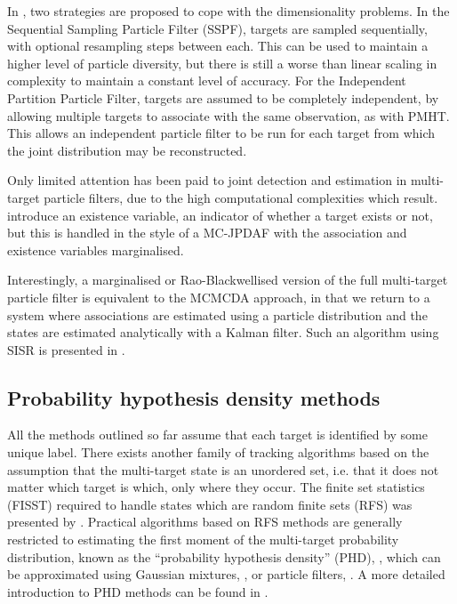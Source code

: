 In \cite{Vermaak2005}, two strategies are proposed to cope with the dimensionality problems. In the Sequential Sampling Particle Filter (SSPF), targets are sampled sequentially, with optional resampling steps between each. This can be used to maintain a higher level of particle diversity, but there is still a worse than linear scaling in complexity to maintain a constant level of accuracy. For the Independent Partition Particle Filter, targets are assumed to be completely independent, by allowing multiple targets to associate with the same observation, as with PMHT. This allows an independent particle filter to be run for each target from which the joint distribution may be reconstructed.

Only limited attention has been paid to joint detection and estimation in multi-target particle filters, due to the high computational complexities which result. \cite{Vermaak2005,Horridge2009} introduce an existence variable, an indicator of whether a target exists or not, but this is handled in the style of a MC-JPDAF with the association and existence variables marginalised.

Interestingly, a marginalised or Rao-Blackwellised version of the full multi-target particle filter is equivalent to the MCMCDA approach, in that we return to a system where associations are estimated using a particle distribution and the states are estimated analytically with a Kalman filter. Such an algorithm using SISR is presented in \cite{Sarkka2007}.




\subsection{Probability hypothesis density methods}
All the methods outlined so far assume that each target is identified by some unique label. There exists another family of tracking algorithms based on the assumption that the multi-target state is an unordered set, i.e. that it does not matter which target is which, only where they occur. The finite set statistics (FISST) required to handle states which are random finite sets (RFS) was presented by \cite{Mahler1994}. Practical algorithms based on RFS methods are generally restricted to estimating the first moment of the multi-target probability distribution, known as the ``probability hypothesis density'' (PHD), \cite{Mahler2003}, which can be approximated using Gaussian mixtures, \cite{Vo2006}, or particle filters, \cite{Vo2005,Whiteley2010}. A more detailed introduction to PHD methods can be found in \cite{Mahler2004,Wood2010}.



